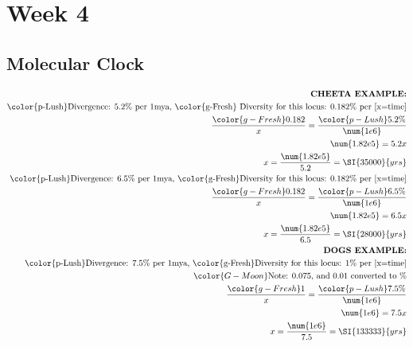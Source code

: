 \documentclass[12pt,a4paper]{article}
\begin{document}





\clearpage
\section*{Week 4}

\subsection{Molecular Clock}
\begin{align*}
    \textbf{CHEETA EXAMPLE:}\\
    \text{{\color{p-Lush}Divergence: 5.2\%} per 1mya, {\color{g-Fresh} Diversity for this locus: 0.182\%} per [x=time]}\\
    \frac{{\color{g-Fresh}0.182}}{x} = \frac{{\color{p-Lush}5.2\%}}{\num{1e6}}\\
    \num{1.82e5}= 5.2x\\
    x = \frac{\num{1.82e5}}{5.2} = \SI{35000}{yrs}\\ 
    \text{{\color{p-Lush}Divergence: 6.5\%} per 1mya, {\color{g-Fresh}Diversity for this locus: 0.182\%} per [x=time]}\\
    \frac{{\color{g-Fresh}0.182}}{x} = \frac{{\color{p-Lush}6.5\%}}{\num{1e6}}\\
    \num{1.82e5}= 6.5x\\
    x = \frac{\num{1.82e5}}{6.5} = \SI{28000}{yrs}\\ 
    \textbf{DOGS EXAMPLE:}\\
    \text{{\color{p-Lush}Divergence: 7.5\%} per 1mya, {\color{g-Fresh}Diversity for this locus: 1\%} per [x=time]}\\
    {\color{G-Moon}\text{Note: 0.075, and 0.01 converted to \%}}\\
    \frac{{\color{g-Fresh}1}}{x} = \frac{{\color{p-Lush}7.5\%}}{\num{1e6}}\\
    \num{1e6}= 7.5x\\
    x = \frac{\num{1e6}}{7.5} = \SI{133333}{yrs}\\
\end{align*}

\newpage
{}
\end{document}
